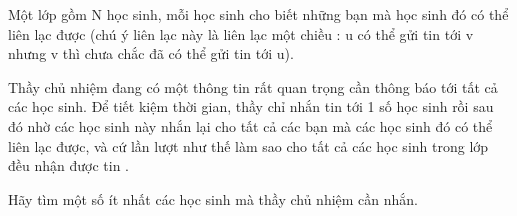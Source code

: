 Một lớp gồm N học sinh, mỗi học sinh cho biết những bạn mà học sinh đó có thể liên lạc được (chú ý liên lạc này là liên lạc một chiều : u có thể gửi tin tới v nhưng v thì chưa chắc đã có thể gửi tin tới u).

Thầy chủ nhiệm đang có một thông tin rất quan trọng cần thông báo tới tất cả các học sinh. Để tiết kiệm thời gian, thầy chỉ nhắn tin tới 1 số học sinh rồi sau đó nhờ các học sinh này nhắn lại cho tất cả các bạn mà các học sinh đó có thể liên lạc được, và cứ lần lượt như thế làm sao cho tất cả các học sinh trong lớp đều nhận được tin .

Hãy tìm một số ít nhất các học sinh mà thầy chủ nhiệm cần nhắn.

\